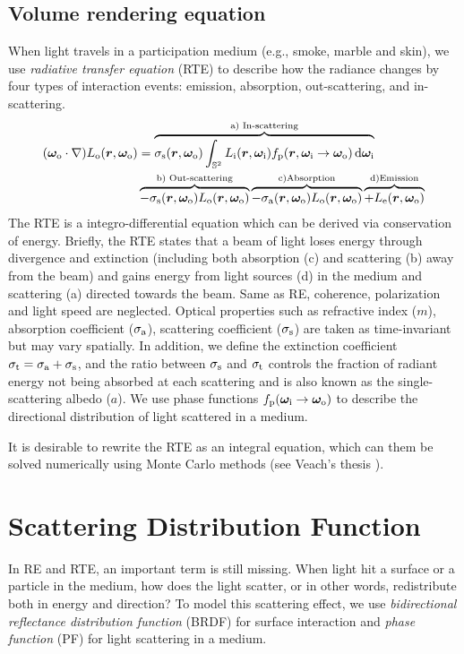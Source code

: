 \subsection{Volume rendering equation}
When light travels in a participation medium (e.g., smoke, marble and skin), we use \emph{radiative transfer equation} (RTE) \cite{chandrasekhar1960radiative} to describe how the radiance changes by four types of interaction events: emission, absorption, out-scattering, and in-scattering.
\begin{equation}
	\begin{aligned}
		(\bm\omega_\mathrm{o}\cdot\nabla) L_\mathrm{o}(\bm{r},\bm\omega_\mathrm{o}) &= 
		\overbrace{\sigma_\mathrm{s}(\bm{r},\bm\omega_\mathrm{o}) \int_{\mathbb{S}^2} L_\mathrm{i}(\bm{r},\bm\omega_\mathrm{i})f_\mathrm{p}(\bm{r},\bm\omega_\mathrm{i}\rightarrow\bm\omega_\mathrm{o}) \,\mathrm{d}\bm\omega_\mathrm{i}}^{\text{a) In-scattering}} \\
		& \overbrace{-\sigma_\mathrm{s}(\bm{r},\bm\omega_\mathrm{o})L_\mathrm{o}(\bm{r},\bm\omega_\mathrm{o})}^{\text{b) Out-scattering}}
		\overbrace{-\sigma_\mathrm{a}(\bm{r},\bm\omega_\mathrm{o})L_\mathrm{o}(\bm{r},\bm\omega_\mathrm{o})}^{\mathrm{c) Absorption}}
		\overbrace{+L_\mathrm{e}(\bm{r},\bm\omega_\mathrm{o})}^{\mathrm{d) Emission}}
	\end{aligned}
\end{equation}
The RTE is a integro-differential equation which can be derived via conservation of energy. Briefly, the RTE states that a beam of light loses energy through divergence and extinction (including both absorption (c) and scattering (b) away from the beam) and gains energy from light sources (d) in the medium and scattering (a) directed towards the beam. Same as RE, coherence, polarization and light speed are neglected. Optical properties such as refractive index ($m$), absorption coefficient ($\sigma_\mathrm{a}$), scattering coefficient ($\sigma_\mathrm{s}$) are taken as time-invariant but may vary spatially. In addition, we define the extinction coefficient $\sigma_\mathrm{t} = \sigma_\mathrm{a} + \sigma_\mathrm{s}$, and the ratio between $\sigma_\mathrm{s}$ and $\sigma_\mathrm{t}$ controls the fraction of radiant energy not being absorbed at each scattering and is also known as the single-scattering albedo ($a$). We use phase functions $f_\mathrm{p}(\bm\omega_\mathrm{i}\rightarrow\bm\omega_\mathrm{o})$ to describe the directional distribution of light scattered in a medium.

It is desirable to rewrite the RTE as an integral equation, which can them be solved numerically using Monte Carlo methods (see Veach's thesis 
\cite{veach1997metropolis}). 

\section{Scattering Distribution Function}
In RE and RTE, an important term is still missing. When light hit a surface or a particle in the medium, how does the light scatter, or in other words, redistribute both in energy and direction? To model this scattering effect, we use \emph{bidirectional reflectance distribution function} (BRDF) for surface interaction and \emph{phase function} (PF) for light scattering in a medium.

